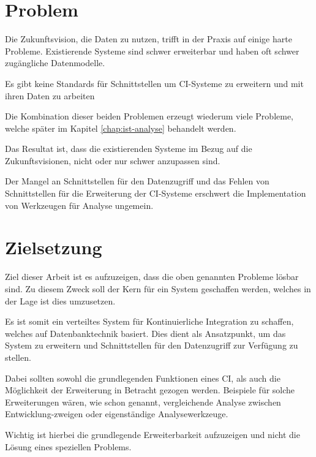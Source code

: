 


\section{Problem}

Die Zukunftsvision, die Daten zu nutzen,
trifft in der Praxis auf einige harte Probleme.
Existierende Systeme sind schwer erweiterbar und haben oft schwer zugängliche Datenmodelle.

Es gibt keine Standards für Schnittstellen um CI-Systeme zu erweitern und mit ihren Daten zu arbeiten

Die Kombination dieser beiden Problemen erzeugt wiederum viele Probleme,
welche später im Kapitel \ref{chap:ist-analyse} behandelt werden.

Das Resultat ist, dass die existierenden Systeme im Bezug auf die Zukunftsvisionen,
nicht oder nur schwer anzupassen sind.

Der Mangel an Schnittstellen für den Datenzugriff und
das Fehlen von Schnittstellen für die Erweiterung der CI-Systeme
erschwert die Implementation von Werkzeugen für Analyse ungemein.


\section{Zielsetzung}
Ziel dieser Arbeit ist es  aufzuzeigen, dass die oben genannten Probleme lösbar sind.
Zu diesem Zweck soll der Kern für ein System geschaffen werden,
welches in der Lage ist dies umzusetzen.

Es ist somit ein verteiltes System für Kontinuierliche Integration zu schaffen,
welches auf Datenbanktechnik basiert.
Dies dient als Ansatzpunkt, um das System zu erweitern und
Schnittstellen für den Datenzugriff zur Verfügung zu stellen.

Dabei sollten sowohl die grundlegenden Funktionen eines CI,
als auch die Möglichkeit der Erweiterung in Betracht gezogen werden.
Beispiele für solche Erweiterungen wären, wie schon genannt,
vergleichende Analyse zwischen Entwicklung-zweigen oder eigenständige Analysewerkzeuge.

Wichtig ist hierbei die grundlegende Erweiterbarkeit aufzuzeigen
und nicht die Lösung eines speziellen Problems.

